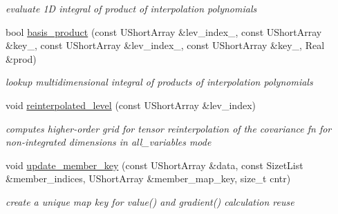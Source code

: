 \begin{DoxyCompactItemize}
\begin{DoxyCompactList}\small\item\em evaluate 1D integral of product of interpolation polynomials \end{DoxyCompactList}\item 
bool \hyperlink{classPecos_1_1SharedNodalInterpPolyApproxData_ac21a0b1255c108d7e0d44995d48b7c76}{basis\+\_\+product} (const U\+Short\+Array \&lev\+\_\+index\+\_, const U\+Short\+Array \&key\+\_, const U\+Short\+Array \&lev\+\_\+index\+\_, const U\+Short\+Array \&key\+\_, Real \&prod)\label{classPecos_1_1SharedNodalInterpPolyApproxData_ac21a0b1255c108d7e0d44995d48b7c76}

\begin{DoxyCompactList}\small\item\em lookup multidimensional integral of products of interpolation polynomials \end{DoxyCompactList}\item 
void \hyperlink{classPecos_1_1SharedNodalInterpPolyApproxData_ae4a694a92e56149b20cf5b7450d3518a}{reinterpolated\+\_\+level} (const U\+Short\+Array \&lev\+\_\+index)
\begin{DoxyCompactList}\small\item\em computes higher-\/order grid for tensor reinterpolation of the covariance fn for non-\/integrated dimensions in all\+\_\+variables mode \end{DoxyCompactList}\item 
void \hyperlink{classPecos_1_1SharedNodalInterpPolyApproxData_acc8e046d91e34a5404891d6bd48aa2d0}{update\+\_\+member\+\_\+key} (const U\+Short\+Array \&data, const Sizet\+List \&member\+\_\+indices, U\+Short\+Array \&member\+\_\+map\+\_\+key, size\+\_\+t cntr)\label{classPecos_1_1SharedNodalInterpPolyApproxData_acc8e046d91e34a5404891d6bd48aa2d0}

\begin{DoxyCompactList}\small\item\em create a unique map key for value() and gradient() calculation reuse \end{DoxyCompactList}\end{DoxyCompactItemize}
